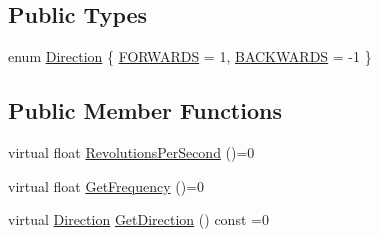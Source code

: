 \subsection*{Public Types}
\begin{DoxyCompactItemize}
\item 
enum \hyperlink{class_encoder_aa7c4648a7ebc9e651c25c2d450a58213}{Direction} \{ \hyperlink{class_encoder_aa7c4648a7ebc9e651c25c2d450a58213a75ee06096317d25b47119647e33622cf}{F\-O\-R\-W\-A\-R\-D\-S} = 1, 
\hyperlink{class_encoder_aa7c4648a7ebc9e651c25c2d450a58213a9fb277421175dd4894688e30dd757253}{B\-A\-C\-K\-W\-A\-R\-D\-S} = -\/1
 \}
\end{DoxyCompactItemize}
\subsection*{Public Member Functions}
\begin{DoxyCompactItemize}
\item 
virtual float \hyperlink{class_encoder_a758adfad11078f8dec0ca672929a4189}{Revolutions\-Per\-Second} ()=0
\item 
virtual float \hyperlink{class_encoder_ab52587693b386731fcdef289e590fc40}{Get\-Frequency} ()=0
\item 
virtual \hyperlink{class_encoder_aa7c4648a7ebc9e651c25c2d450a58213}{Direction} \hyperlink{class_encoder_ab4faff630f313bc0e5b8718df3175fe1}{Get\-Direction} () const =0
\end{DoxyCompactItemize}


